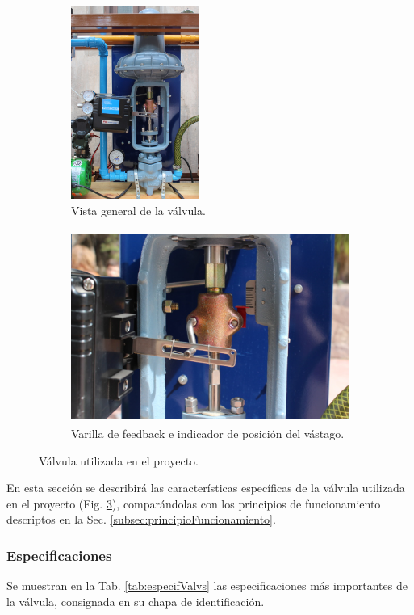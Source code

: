 \begin{figure}[t]
        \centering
        \begin{subfigure}[b]{0.31\textwidth}
		\centering
\includegraphics[height=6.3cm]{Cap2-DisenoEnsamblado/images/IMG_5129.JPG}
		\caption{Vista general de la válvula.}
		\label{fig:fotoValvCompl}
        \end{subfigure}%
	\hfill
	\begin{subfigure}[b]{0.69\textwidth}
		\centering
\includegraphics[height=6.3cm]{Cap2-DisenoEnsamblado/images/IMG_5030.JPG}
	\caption{Varilla de feedback e indicador de posición del vástago.}
		\label{fig:fotoValvDetalle}
	\end{subfigure}%
	\caption{Válvula utilizada en el proyecto.}
	\label{fig:fotoValv}
\end{figure}

En esta sección se describirá las características específicas de la válvula
utilizada en el proyecto (Fig. \ref{fig:fotoValv}), comparándolas con los
principios de funcionamiento
descriptos en la Sec. \ref{subsec:principioFuncionamiento}.

\subsubsection{Especificaciones}
Se muestran en la Tab. \ref{tab:especifValvs} las especificaciones más
importantes de la válvula, consignada en su chapa de identificación.

